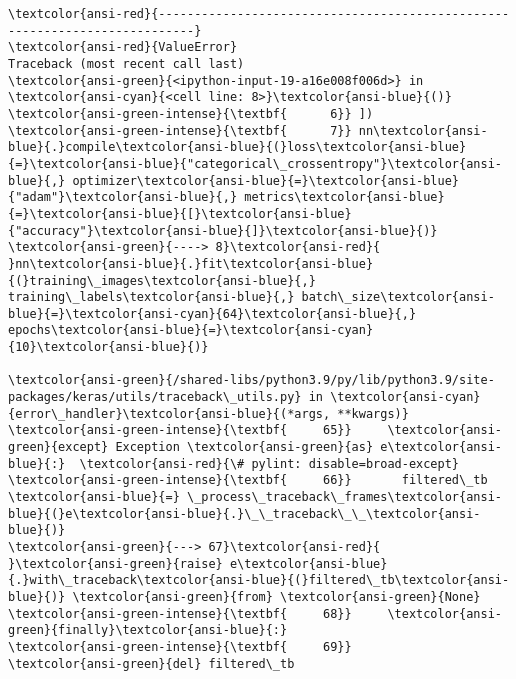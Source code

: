\documentclass[12pt,a4paper,table]{article}
\begin{document}
    \begin{Verbatim}[commandchars=\\\{\}, frame=single, framerule=2mm, rulecolor=\color{outerrorbackground}]
\textcolor{ansi-red}{---------------------------------------------------------------------------}
\textcolor{ansi-red}{ValueError}                                Traceback (most recent call last)
\textcolor{ansi-green}{<ipython-input-19-a16e008f006d>} in \textcolor{ansi-cyan}{<cell line: 8>}\textcolor{ansi-blue}{()}
\textcolor{ansi-green-intense}{\textbf{      6}} ])
\textcolor{ansi-green-intense}{\textbf{      7}} nn\textcolor{ansi-blue}{.}compile\textcolor{ansi-blue}{(}loss\textcolor{ansi-blue}{=}\textcolor{ansi-blue}{"categorical\_crossentropy"}\textcolor{ansi-blue}{,} optimizer\textcolor{ansi-blue}{=}\textcolor{ansi-blue}{"adam"}\textcolor{ansi-blue}{,} metrics\textcolor{ansi-blue}{=}\textcolor{ansi-blue}{[}\textcolor{ansi-blue}{"accuracy"}\textcolor{ansi-blue}{]}\textcolor{ansi-blue}{)}
\textcolor{ansi-green}{----> 8}\textcolor{ansi-red}{ }nn\textcolor{ansi-blue}{.}fit\textcolor{ansi-blue}{(}training\_images\textcolor{ansi-blue}{,} training\_labels\textcolor{ansi-blue}{,} batch\_size\textcolor{ansi-blue}{=}\textcolor{ansi-cyan}{64}\textcolor{ansi-blue}{,} epochs\textcolor{ansi-blue}{=}\textcolor{ansi-cyan}{10}\textcolor{ansi-blue}{)}

\textcolor{ansi-green}{/shared-libs/python3.9/py/lib/python3.9/site-packages/keras/utils/traceback\_utils.py} in \textcolor{ansi-cyan}{error\_handler}\textcolor{ansi-blue}{(*args, **kwargs)}
\textcolor{ansi-green-intense}{\textbf{     65}}     \textcolor{ansi-green}{except} Exception \textcolor{ansi-green}{as} e\textcolor{ansi-blue}{:}  \textcolor{ansi-red}{\# pylint: disable=broad-except}
\textcolor{ansi-green-intense}{\textbf{     66}}       filtered\_tb \textcolor{ansi-blue}{=} \_process\_traceback\_frames\textcolor{ansi-blue}{(}e\textcolor{ansi-blue}{.}\_\_traceback\_\_\textcolor{ansi-blue}{)}
\textcolor{ansi-green}{---> 67}\textcolor{ansi-red}{       }\textcolor{ansi-green}{raise} e\textcolor{ansi-blue}{.}with\_traceback\textcolor{ansi-blue}{(}filtered\_tb\textcolor{ansi-blue}{)} \textcolor{ansi-green}{from} \textcolor{ansi-green}{None}
\textcolor{ansi-green-intense}{\textbf{     68}}     \textcolor{ansi-green}{finally}\textcolor{ansi-blue}{:}
\textcolor{ansi-green-intense}{\textbf{     69}}       \textcolor{ansi-green}{del} filtered\_tb


\end{Verbatim}
\end{document}
